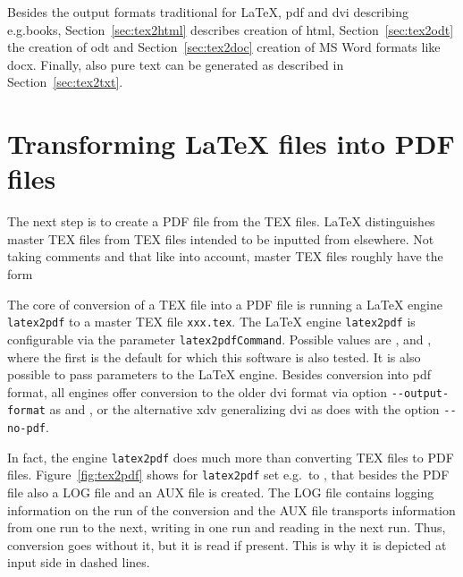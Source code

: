 Besides the output formats traditional for \LaTeX, 
\gls{pdf} and \gls{dvi} describing e.g.\@ books, 
Section~\ref{sec:tex2html} describes creation of 
\gls{html}, Section~\ref{sec:tex2odt} the creation of \gls{odt} and 
Section~\ref{sec:tex2doc} creation of MS Word formats like \gls{docx}. 
Finally, also pure text can be generated 
as described in Section~\ref{sec:tex2txt}. 

\newpage


\section{Transforming \LaTeX{} files into PDF files}\label{sec:tex2pdf}

The next step is to create a PDF file from the TEX files. 
\LaTeX{} distinguishes master TEX files from TEX files intended to be inputted
from elsewhere. 
Not taking comments and that like into account, 
master TEX files roughly have the form 
%

The core of conversion of a TEX file into a PDF file 
is running a \LaTeX{} engine \texttt{latex2pdf} 
to a master TEX file \texttt{xxx.tex}.
The \LaTeX{} engine \texttt{latex2pdf} 
is configurable via the parameter \texttt{latex2pdfCommand}. 
Possible values are \lualatex{}, \xelatex{} and \pdflatex, 
where the first is the default for which this software is also tested. 
It is also possible to pass parameters to the \LaTeX{} engine. 
Besides conversion into \gls{pdf} format, 
all engines offer conversion to the older \gls{dvi} format 
via option \texttt{-{}-output-format} as \lualatex{} and \pdflatex, 
or the alternative \gls{xdv} generalizing \gls{dvi} 
as \xelatex{} does with the option \texttt{-{}-no-pdf}. 

In fact, the engine \texttt{latex2pdf} 
does much more than converting TEX files to PDF files. 
Figure~\ref{fig:tex2pdf} shows for \texttt{latex2pdf} set e.g.~to \lualatex{}, 
that besides the PDF file also a LOG file and an AUX file is created. 
The LOG file contains logging information on the run of the conversion 
and the AUX file transports information from one run to the next, 
writing in one run and reading in the next run. 
Thus, conversion goes without it, but it is read if present. 
This is why it is depicted at input side in dashed lines. 

